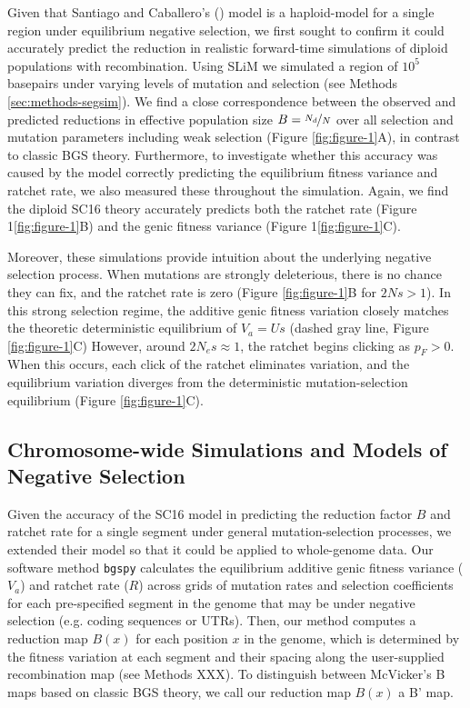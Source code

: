 \documentclass[11pt]{article}
\begin{document}
Given that Santiago and Caballero's (\citeyear{Santiago2016-mu}) model is a
haploid-model for a single region under equilibrium negative selection, we
first sought to confirm it could accurately predict the reduction in realistic
forward-time simulations of diploid populations with recombination. Using SLiM
\parencite{Haller2019-vu,Haller2023-uk} we simulated a region of $10^5$
basepairs under varying levels of mutation and selection (see Methods
\ref{sec:methods-segsim}). We find a close correspondence between the observed
and predicted reductions in effective population size $B=\nicefrac{N_d}{N}$
over all selection and mutation parameters including weak selection (Figure
\ref{fig:figure-1}A), in contrast to classic BGS theory. Furthermore, to
investigate whether this accuracy was caused by the model correctly predicting
the equilibrium fitness variance and ratchet rate, we also measured these
throughout the simulation. Again, we find the diploid SC16 theory accurately
predicts both the ratchet rate (Figure 1\ref{fig:figure-1}B) and the genic
fitness variance (Figure 1\ref{fig:figure-1}C).

Moreover, these simulations provide intuition about the underlying negative
selection process. When mutations are strongly deleterious, there is no chance
they can fix, and the ratchet rate is zero (Figure \ref{fig:figure-1}B for $2Ns
> 1$). In this strong selection regime, the additive genic fitness variation
closely matches the theoretic deterministic equilibrium of $V_a = Us$ (dashed
gray line, Figure \ref{fig:figure-1}C) However, around $2N_e s \approx 1$, the
ratchet begins clicking as $p_F > 0$. When this occurs, each click of the
ratchet eliminates variation, and the equilibrium variation diverges from the
deterministic mutation-selection equilibrium (Figure \ref{fig:figure-1}C).

\subsection*{Chromosome-wide Simulations and Models of Negative Selection}

Given the accuracy of the SC16 model in predicting the reduction factor $B$ and
ratchet rate for a single segment under general mutation-selection processes,
we extended their model so that it could be applied to whole-genome data. Our
software method \texttt{bgspy} calculates the equilibrium additive genic
fitness variance ($V_a$) and ratchet rate ($R$) across grids of mutation rates
and selection coefficients for each pre-specified segment in the genome that
may be under negative selection (e.g. coding sequences or UTRs). Then, our
method computes a reduction map $B(x)$ for each position $x$ in the genome,
which is determined by the fitness variation at each segment and their spacing
along the user-supplied recombination map (see Methods XXX). To distinguish
between McVicker's B maps based on classic BGS theory, we call our reduction
map $B(x)$ a B' map.
\end{document}
